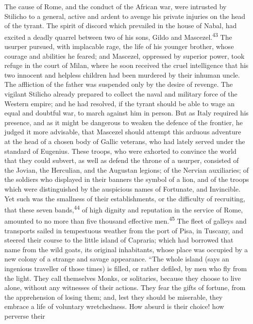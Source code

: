 The cause of Rome, and the conduct of the African war, were
intrusted by Stilicho to a general, active and ardent to avenge
his private injuries on the head of the tyrant. The spirit of
discord which prevailed in the house of Nabal, had excited a
deadly quarrel between two of his sons, Gildo and Mascezel.\textsuperscript{43}
The usurper pursued, with implacable rage, the life of his
younger brother, whose courage and abilities he feared; and
Mascezel, oppressed by superior power, took refuge in the court
of Milan, where he soon received the cruel intelligence that his
two innocent and helpless children had been murdered by their
inhuman uncle. The affliction of the father was suspended only by
the desire of revenge. The vigilant Stilicho already prepared to
collect the naval and military force of the Western empire; and
he had resolved, if the tyrant should be able to wage an equal
and doubtful war, to march against him in person. But as Italy
required his presence, and as it might be dangerous to weaken the
defence of the frontier, he judged it more advisable, that
Mascezel should attempt this arduous adventure at the head of a
chosen body of Gallic veterans, who had lately served under the
standard of Eugenius. These troops, who were exhorted to convince
the world that they could subvert, as well as defend the throne
of a usurper, consisted of the Jovian, the Herculian, and the
Augustan legions; of the Nervian auxiliaries; of the soldiers who
displayed in their banners the symbol of a lion, and of the
troops which were distinguished by the auspicious names of
Fortunate, and Invincible. Yet such was the smallness of their
establishments, or the difficulty of recruiting, that these seven
bands,\textsuperscript{44} of high dignity and reputation in the service of Rome,
amounted to no more than five thousand effective men.\textsuperscript{45} The
fleet of galleys and transports sailed in tempestuous weather
from the port of Pisa, in Tuscany, and steered their course to
the little island of Capraria; which had borrowed that name from
the wild goats, its original inhabitants, whose place was
occupied by a new colony of a strange and savage appearance. “The
whole island (says an ingenious traveller of those times) is
filled, or rather defiled, by men who fly from the light. They
call themselves Monks, or solitaries, because they choose to live
alone, without any witnesses of their actions. They fear the
gifts of fortune, from the apprehension of losing them; and, lest
they should be miserable, they embrace a life of voluntary
wretchedness. How absurd is their choice! how perverse their
